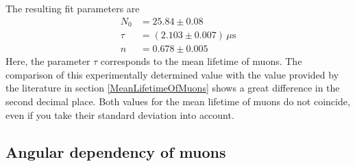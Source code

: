 The resulting fit parameters are
\begin{align*}
N_0 &= 25.84\pm 0.08 \\
\tau &= (2.103\pm 0.007)\,\mu\text{s} \\
n &= 0.678\pm 0.005
\end{align*}
\noindent Here, the parameter $\tau$ corresponds to the mean lifetime of muons.
The comparison of this experimentally determined value with the value provided by the literature in section \ref{MeanLifetimeOfMuons} shows a great difference in the second decimal place.
Both values for the mean lifetime of muons do not coincide, even if you take their standard deviation into account.



\subsection{Angular dependency of muons}

